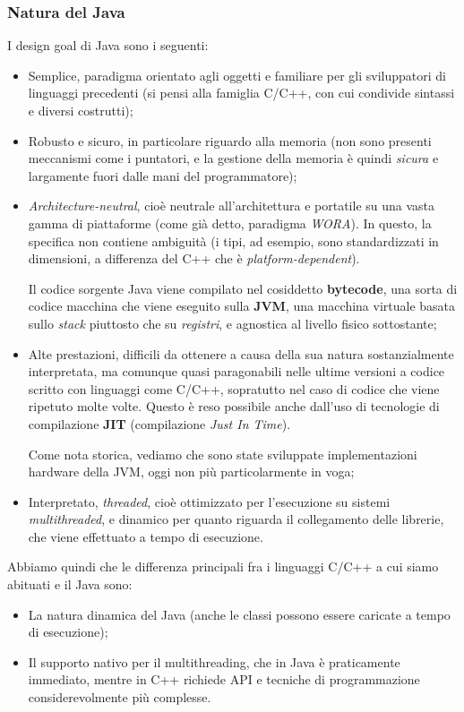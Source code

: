 \documentclass[a4paper,11pt]{article}
\begin{document}
\subsubsection{Natura del Java}
I design goal di Java sono i seguenti: 
\begin{itemize}
	\item Semplice, paradigma orientato agli oggetti e familiare per gli sviluppatori di linguaggi precedenti (si pensi alla famiglia C/C++, con cui condivide sintassi e diversi costrutti);
	\item Robusto e sicuro, in particolare riguardo alla memoria (non sono presenti meccanismi come i puntatori, e la gestione della memoria è quindi \textit{sicura} e largamente fuori dalle mani del programmatore);
	\item \textit{Architecture-neutral}, cioè neutrale all'architettura e portatile su una vasta gamma di piattaforme (come già detto, paradigma \textit{WORA}). In questo, la specifica non contiene ambiguità (i tipi, ad esempio, sono standardizzati in dimensioni, a differenza del C++ che è \textit{platform-dependent}).

		Il codice sorgente Java viene compilato nel cosiddetto \textbf{bytecode}, una sorta di codice macchina che viene eseguito sulla \textbf{JVM}, una macchina virtuale basata sullo \textit{stack} piuttosto che su \textit{registri}, e agnostica al livello fisico sottostante;
	\item Alte prestazioni, difficili da ottenere a causa della sua natura sostanzialmente interpretata, ma comunque quasi paragonabili nelle ultime versioni a codice scritto con linguaggi come C/C++, sopratutto nel caso di codice che viene ripetuto molte volte.
		Questo è reso possibile anche dall'uso di tecnologie di compilazione \textbf{JIT} (compilazione \textit{Just In Time}).

		Come nota storica, vediamo che sono state sviluppate implementazioni hardware della JVM, oggi non più particolarmente in voga;
	\item Interpretato, \textit{threaded}, cioè ottimizzato per l'esecuzione su sistemi \textit{multithreaded}, e dinamico per quanto riguarda il collegamento delle librerie, che viene effettuato a tempo di esecuzione.
\end{itemize}

Abbiamo quindi che le differenza principali fra i linguaggi C/C++ a cui siamo abituati e il Java sono:
\begin{itemize}
	\item La natura dinamica del Java (anche le classi possono essere caricate a tempo di esecuzione);
	\item Il supporto nativo per il multithreading, che in Java è praticamente immediato, mentre in C++ richiede API e tecniche di programmazione considerevolmente più complesse.
\end{itemize}
\end{document}
